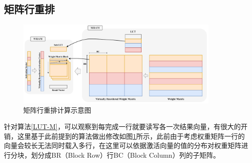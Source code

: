 \subsection{矩阵行重排}

\begin{figure}[!htbp]
	\centering
    \includegraphics[width=0.9\textwidth]{figures/LUTRow.pdf}
	\caption{矩阵行重排计算示意图}
    \label{LUTRow}
\end{figure}

针对算法\ref{LUT-M}，可以观察到每完成一行就要读写各一次结果向量，有很大的开销，这里基于此前提到的算法做出修改如图\ref{LUTRow}所示，此前由于考虑权重矩阵一行的向量会较长无法同时载入多行，在这里可以依据激活向量的值的分布对权重矩阵进行分块，划分成BR（Block Row）行BC（Block Column）列的子矩阵。

